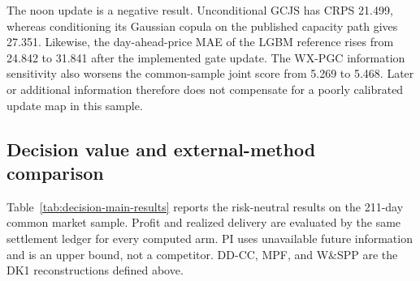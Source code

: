 \documentclass[11pt,a4paper]{article}
\begin{document}
The noon update is a negative result.  Unconditional GCJS has CRPS 21.499,
whereas conditioning its Gaussian copula on the published capacity path gives
27.351.  Likewise, the day-ahead-price MAE of the LGBM reference rises from
24.842 to 31.841 after the implemented gate update.  The WX-PGC information
sensitivity also worsens the common-sample joint score from 5.269 to 5.468.
Later or additional information therefore does not compensate for a poorly
calibrated update map in this sample.

\subsection{Decision value and external-method comparison}

Table~\ref{tab:decision-main-results} reports the risk-neutral results on the
211-day common market sample.  Profit and realized delivery are evaluated by
the same settlement ledger for every computed arm.  PI uses unavailable future
information and is an upper bound, not a competitor.  DD-CC, MPF, and W\&SPP
are the DK1 reconstructions defined above.

\begin{table}[htbp]
  \centering
  \small
  \caption{Main decision results under the common DK1 protocol (authors'
  calculations).}
  \label{tab:decision-main-results}
\end{table}
\end{document}
